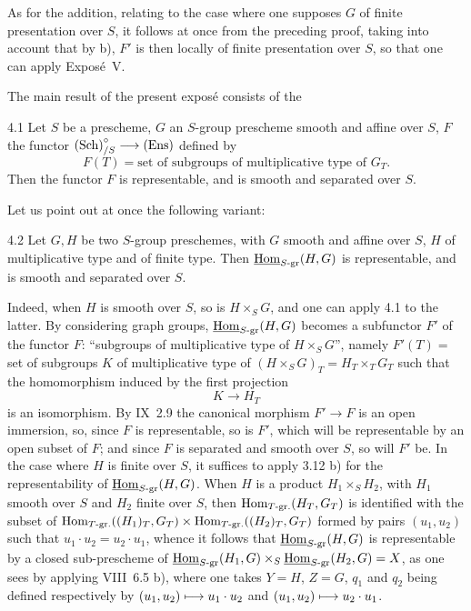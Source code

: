 As for the addition, relating to the case where one supposes $G$ of finite presentation over $S$, it follows at once from the preceding proof, taking into account that by b), $F'$ is then locally of finite presentation over $S$, so that one can apply Exposé~V.

The main result of the present exposé consists of the
\begin{theorem}{4.1}\label{XI.4.1}
Let $S$ be a prescheme, $G$ an $S$-group prescheme smooth and affine over $S$, $F$ the functor $\textup{(Sch)}^\circ_{/S}\longrightarrow\textup{(Ens)}$ defined by
\[
F(T)=\text{set of subgroups of multiplicative type of }G_T.
\]
Then the functor $F$ is representable, and is smooth and separated over $S$.
\end{theorem}
Let us point out at once the following variant:
\begin{corollary}{4.2}\label{XI.4.2}
Let $G,H$ be two $S$-group preschemes, with $G$ smooth and affine over $S$, $H$ of multiplicative type and of finite type. Then $\underline{\operatorname{Hom}}_{S\text{-gr}}(H,G)$ is representable, and is smooth and separated over $S$.
\end{corollary}
Indeed, when $H$ is smooth over $S$, so is $H\times_S G$, and one can apply 4.1 to the latter. By considering graph groups, $\underline{\operatorname{Hom}}_{S\text{-gr}}(H,G)$ becomes a subfunctor $F'$ of the functor $F$: ``subgroups of multiplicative type of $H\times_S G$'', namely $F'(T)=$ set of subgroups $K$ of multiplicative type of $(H\times_S G)_T=H_T\times_T G_T$ such that the homomorphism induced by the first projection
\[
K\to H_T
\]
is an isomorphism. By IX~2.9 the canonical morphism $F'\to F$ is an open immersion, so, since $F$ is representable, so is $F'$, which will be representable by an open subset of $F$; and since $F$ is separated and smooth over $S$, so will $F'$ be. In the case where $H$ is finite over $S$, it suffices to apply 3.12 b) for the representability of $\underline{\operatorname{Hom}}_{S\text{-gr}}(H,G)$. When $H$ is a product $H_1\times_S H_2$, with $H_1$ smooth over $S$ and $H_2$ finite over $S$, then $\operatorname{Hom}_{T\text{-gr.}}(H_T,G_T)$ is identified with the subset of $\operatorname{Hom}_{T\text{-gr.}}((H_1)_T,G_T)\times\operatorname{Hom}_{T\text{-gr.}}((H_2)_T,G_T)$ formed by pairs $(u_1,u_2)$ such that $u_1\cdot u_2=u_2\cdot u_1$, whence it follows that $\underline{\operatorname{Hom}}_{S\text{-gr}}(H,G)$ is representable by a closed sub-prescheme of $\underline{\operatorname{Hom}}_{S\text{-gr}}(H_1,G)\times_S\underline{\operatorname{Hom}}_{S\text{-gr}}(H_2,G)=X$, as one sees by applying VIII~6.5 b), where one takes $Y=H$, $Z=G$, $q_1$ and $q_2$ being defined respectively by $(u_1,u_2)\longmapsto u_1\cdot u_2$ and $(u_1,u_2)\longmapsto u_2\cdot u_1$.

